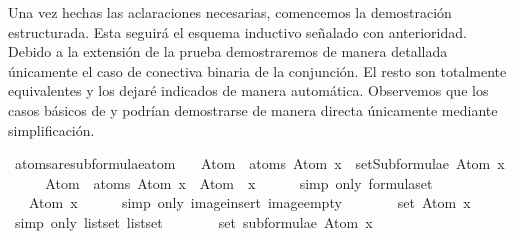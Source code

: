 \begin{isabellebody}
\begin{isamarkuptext}
  Una vez hechas las aclaraciones necesarias, comencemos la demostración 
  estructurada. Esta seguirá el esquema inductivo señalado con 
  anterioridad. Debido a la extensión de la prueba demostraremos de 
  manera detallada únicamente el caso de conectiva binaria de la 
  conjunción. El resto son totalmente equivalentes y los dejaré 
  indicados de manera automática. Observemos que los casos básicos de 
   y \isa{{\isasymbottom}} podrían demostrarse de manera directa 
  únicamente mediante simplificación.%
\end{isamarkuptext}\isamarkuptrue%
\isamarkupfalse%
\ atoms{\isacharunderscore}are{\isacharunderscore}subformulae{\isacharunderscore}atom{\isacharcolon}\ \isanewline
\ \ {\isachardoublequoteopen}Atom\ {\isacharbackquote}\ atoms\ {\isacharparenleft}Atom\ x{\isacharparenright}\ {\isasymsubseteq}\ setSubformulae\ {\isacharparenleft}Atom\ x{\isacharparenright}{\isachardoublequoteclose}\ \isanewline
%
\isadelimproof
%
\endisadelimproof
%
\isatagproof
{}\isamarkupfalse%
\ {\isacharminus}\isanewline
\ \ \isamarkupfalse%
\ {\isachardoublequoteopen}Atom\ {\isacharbackquote}\ atoms\ {\isacharparenleft}Atom\ x{\isacharparenright}\ {\isacharequal}\ Atom\ {\isacharbackquote}\ {\isacharbraceleft}x{\isacharbraceright}{\isachardoublequoteclose}\isanewline
\ \ \ \ \isamarkupfalse%
\ {\isacharparenleft}simp\ only{\isacharcolon}\ formula{\isachardot}set{\isacharparenleft}{}{\isacharparenright}{\isacharparenright}\isanewline
\ \ \isamarkupfalse%
\ \isamarkupfalse%
\ {\isachardoublequoteopen}{\isasymdots}\ {\isacharequal}\ {\isacharbraceleft}Atom\ x{\isacharbraceright}{\isachardoublequoteclose}\isanewline
\ \ \ \ \isamarkupfalse%
\ {\isacharparenleft}simp\ only{\isacharcolon}\ image{\isacharunderscore}insert\ image{\isacharunderscore}empty{\isacharparenright}\isanewline
\ \ \isamarkupfalse%
\ \isamarkupfalse%
\ {\isachardoublequoteopen}{\isasymdots}\ {\isacharequal}\ set\ {\isacharbrackleft}Atom\ x{\isacharbrackright}{\isachardoublequoteclose}\isanewline
\ \ \ \ \isamarkupfalse%
\ {\isacharparenleft}simp\ only{\isacharcolon}\ list{\isachardot}set{\isacharparenleft}{}{\isacharparenright}\ list{\isachardot}set{\isacharparenleft}{}{\isacharparenright}{\isacharparenright}\isanewline
\ \ \isamarkupfalse%
\ \isamarkupfalse%
\ {\isachardoublequoteopen}{\isasymdots}\ {\isacharequal}\ set\ {\isacharparenleft}subformulae\ {\isacharparenleft}Atom\ x{\isacharparenright}{\isacharparenright}{\isachardoublequoteclose}\isanewline

\end{isabellebody}
